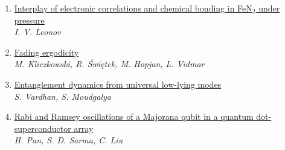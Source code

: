 \documentclass{article}
\begin{document}
\begin{enumerate}
\item\href{http://arxiv.org/abs/2407.16783v1}{\textsf{Interplay of electronic correlations and chemical bonding in FeN$_2$
  under pressure}}\\
{\small\color{blue}\textsl{I. V. Leonov}}
\item\href{http://arxiv.org/abs/2407.16773v1}{\textsf{Fading ergodicity}}\\
{\small\color{blue}\textsl{M. Kliczkowski, R. Świętek, M. Hopjan, L. Vidmar}}
\item\href{http://arxiv.org/abs/2407.16763v1}{\textsf{Entanglement dynamics from universal low-lying modes}}\\
{\small\color{blue}\textsl{S. Vardhan, S. Moudgalya}}
\item\href{http://arxiv.org/abs/2407.16750v1}{\textsf{Rabi and Ramsey oscillations of a Majorana qubit in a quantum
  dot-superconductor array}}\\
{\small\color{blue}\textsl{H. Pan, S. D. Sarma, C. Liu}}
\end{enumerate}
\end{document}
